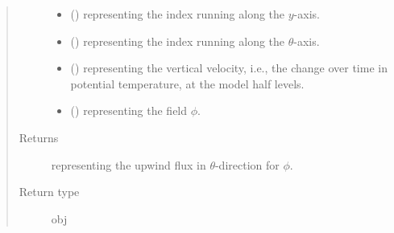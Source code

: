\documentclass[letterpaper,10pt,english]{sphinxmanual}
\begin{document}
\begin{fulllineitems}
\begin{fulllineitems}
\begin{quote}
\begin{description}
\begin{itemize}
\item {} 
 () \textendash{}  representing the index running along the \(y\)-axis.

\item {} 
 () \textendash{}  representing the index running along the \(\theta\)-axis.

\item {} 
 () \textendash{}  representing the vertical velocity, i.e., the change over time in
potential temperature, at the model half levels.

\item {} 
 () \textendash{}  representing the field \(\phi\).

\end{itemize}

\item[{Returns}] \leavevmode
{} representing the upwind flux in \(\theta\)-direction for \(\phi\).

\item[{Return type}] \leavevmode
obj

\end{description}\end{quote}

\end{fulllineitems}


\end{fulllineitems}

\end{document}
